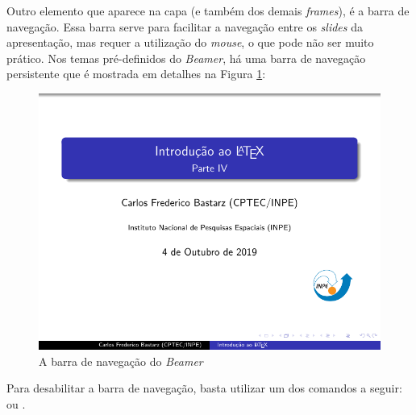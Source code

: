 Outro elemento que aparece na capa (e também dos demais \textit{frames}), é a barra de navegação. Essa barra serve para facilitar a navegação entre os \textit{slides} da apresentação, mas requer a utilização do \textit{mouse}, o que pode não ser muito prático. Nos temas pré-definidos do \textit{Beamer}, há uma barra de navegação persistente que é mostrada em detalhes na Figura \ref{fig:navbar}:

\begin{figure}[H]
\caption{A barra de navegação do \textit{Beamer}}
\vspace{6mm}
  \begin{center}
    \includegraphics[trim={8cm 0.35cm 0 8.75cm}, clip, scale=3]{./docs/figs/beamer-capa.pdf}
  \end{center}
\vspace{4mm}
\label{fig:navbar}
\end{figure}

Para desabilitar a barra de navegação, basta utilizar um dos comandos a seguir: \texttt{\beamertemplatenavigationsymbolsempty} ou \texttt{}.


